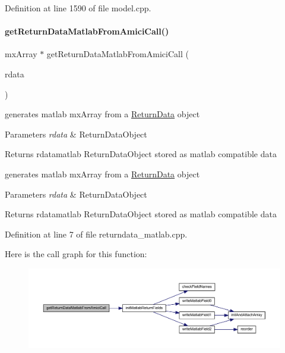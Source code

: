 Definition at line 1590 of file model.\+cpp.

\mbox{\label{namespaceamici_a698409f4b9ce06055bcebcee39f81a91}} 
\paragraph{\texorpdfstring{getReturnDataMatlabFromAmiciCall()}{getReturnDataMatlabFromAmiciCall()}}
{\footnotesize\ttfamily mx\+Array $\ast$ get\+Return\+Data\+Matlab\+From\+Amici\+Call (\begin{DoxyParamCaption}\item[{\mbox{\hyperlink{classamici_1_1_return_data}{Return\+Data}} const $\ast$}]{rdata }\end{DoxyParamCaption})}

generates matlab mx\+Array from a \mbox{\hyperlink{classamici_1_1_return_data}{Return\+Data}} object 
\begin{DoxyParams}{Parameters}
{\em rdata} & Return\+Data\+Object \\
\hline
\end{DoxyParams}
\begin{DoxyReturn}{Returns}
rdatamatlab Return\+Data\+Object stored as matlab compatible data
\end{DoxyReturn}
generates matlab mx\+Array from a \mbox{\hyperlink{classamici_1_1_return_data}{Return\+Data}} object 
\begin{DoxyParams}{Parameters}
{\em rdata} & Return\+Data\+Object \\
\hline
\end{DoxyParams}
\begin{DoxyReturn}{Returns}
rdatamatlab Return\+Data\+Object stored as matlab compatible data
\end{DoxyReturn}


Definition at line 7 of file returndata\+\_\+matlab.\+cpp.

Here is the call graph for this function\+:
\nopagebreak
\begin{figure}[H]
\begin{center}
\leavevmode
\includegraphics[width=350pt]{namespaceamici_a698409f4b9ce06055bcebcee39f81a91_cgraph}
\end{center}
\end{figure}
\mbox{\label{namespaceamici_a7449834fca1e0bde53d5f73ae0d2b929}} 

